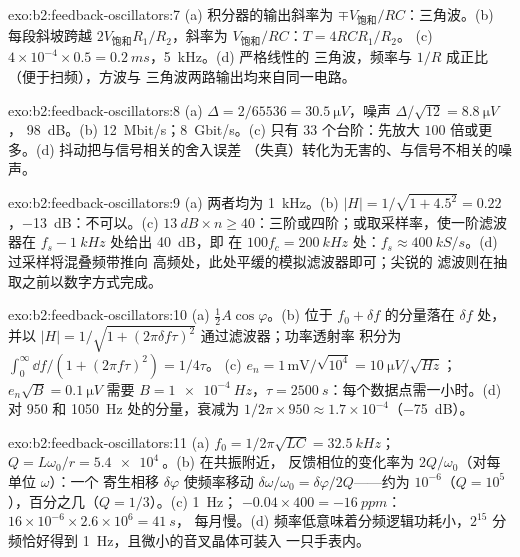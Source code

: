 \begin{solution}{exo:b2:feedback-oscillators:7}
(a) 积分器的输出斜率为 $\mp V_{\text{饱和}}/RC$：三角波。(b)
每段斜坡跨越 $2V_{\text{饱和}}R_1/R_2$，斜率为 $V_{\text{饱和}}/RC$：$T = 4RCR_1/R_2$。
(c) $4 \times 10^{-4} \times 0.5 = \qty{0.2}{ms}$，\qty{5}{kHz}。(d) 严格线性的
三角波，频率与 $1/R$ 成正比（便于扫频），方波与
三角波两路输出均来自同一电路。
\end{solution}

\begin{solution}{exo:b2:feedback-oscillators:8}
(a) $\Delta = 2/65536 = \qty{30.5}{\micro V}$，噪声 $\Delta/\sqrt{12} = \qty{8.8}{\micro V}$，
\qty{98}{dB}。(b) \qty{12}{Mbit/s}；\qty{8}{Gbit/s}。(c) 只有 $33$ 个台阶：先放大
$100$ 倍或更多。(d) 抖动把与信号相关的舍入误差
（失真）转化为无害的、与信号不相关的噪声。
\end{solution}

\begin{solution}{exo:b2:feedback-oscillators:9}
(a) 两者均为 \qty{1}{kHz}。(b) $|H| = 1/\sqrt{1 + 4.5^2} = 0.22$，\qty{-13}{dB}：不可以。(c)
$\qty{13}{dB} \times n \ge 40$：三阶或四阶；或取采样率，使一阶滤波器在
$f_s - \qty{1}{kHz}$ 处给出 \qty{40}{dB}，即
在 $100f_c = \qty{200}{kHz}$ 处：$f_s \approx \qty{400}{kS/s}$。(d) 过采样将混叠频带推向
高频处，此处平缓的模拟滤波器即可；尖锐的
滤波则在抽取之前以数字方式完成。
\end{solution}

\begin{solution}{exo:b2:feedback-oscillators:10}
(a) $\tfrac12A\cos\varphi$。(b) 位于 $f_0 + \delta f$ 的分量落在 $\delta f$ 处，
并以 $|H| = 1/\sqrt{1 + (2\pi\delta f\tau)^2}$ 通过滤波器；功率透射率
积分为 $\int_0^\infty\dd f/(1 + (2\pi f\tau)^2) = 1/4\tau$。
(c) $e_n = 1\,\text{mV}/\sqrt{10^4} = \qty{10}{\micro V/\sqrt{Hz}}$；$e_n\sqrt B = \qty{0.1}{\micro V}$
需要 $B = \qty{1e-4}{Hz}$，$\tau = \qty{2500}{s}$：每个数据点需一小时。(d) 对 $950$
和 \qty{1050}{Hz} 处的分量，衰减为 $1/2\pi \times 950 \approx 1.7 \times 10^{-4}$（\qty{-75}{dB}）。
\end{solution}

\begin{solution}{exo:b2:feedback-oscillators:11}
(a) $f_0 = 1/2\pi\sqrt{LC} = \qty{32.5}{kHz}$；$Q = L\omega_0/r = \qty{5.4e4}{}$。(b) 在共振附近，
反馈相位的变化率为 $2Q/\omega_0$（对每单位 $\omega$）：一个
寄生相移 $\delta\varphi$ 使频率移动 $\delta\omega/\omega_0 =
\delta\varphi/2Q$——约为 $10^{-6}$（$Q = 10^5$），百分之几（$Q = 1/3$）。(c) \qty{1}{Hz}；
$-0.04 \times 400 = \qty{-16}{ppm}$：$16 \times 10^{-6} \times 2.6 \times 10^6 = \qty{41}{s}$，
每月慢。(d) 频率低意味着分频逻辑功耗小，$2^{15}$
分频恰好得到 \qty{1}{Hz}，且微小的音叉晶体可装入
一只手表内。
\end{solution}

